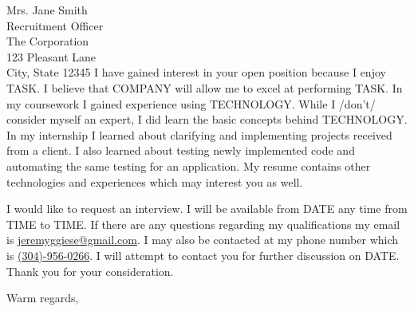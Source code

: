 \documentclass[11pt]{letter} %
\begin{document}
\begin{letter}{Mrs. Jane Smith \\
Recruitment Officer \\
The Corporation \\
123 Pleasant Lane \\
City, State 12345}
I have gained interest in your open position because I enjoy TASK. I believe that COMPANY will allow me to excel at performing TASK. In my coursework I gained experience using TECHNOLOGY. While I /don't/ consider myself an expert, I did learn the basic concepts behind TECHNOLOGY. In my internship I learned about clarifying and implementing projects received from a client. I also learned about testing newly implemented code and automating the same testing for an application. My resume contains other technologies and experiences which may interest you as well.
 
 I would like to request an interview. I will be available from DATE any time from TIME to TIME. If there are any questions regarding my qualifications my email is  \href{mailto:jeremyggiese@gmail.com}{jeremyggiese@gmail.com}. I may also be contacted at my phone number which is \href{tel:3049560266}{(304)-956-0266}. I will attempt to contact you for further discussion on DATE. Thank you for your consideration.

\closing{Warm regards,}




\end{letter}
\end{document}
